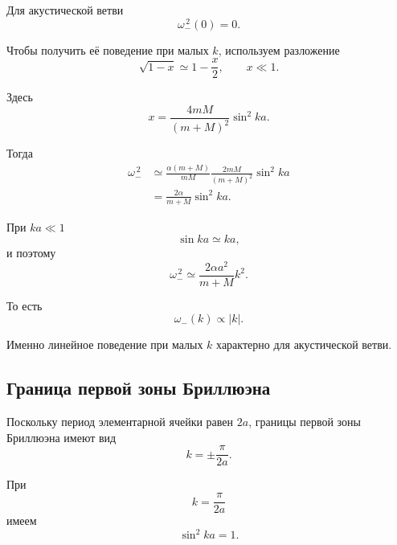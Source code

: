 \documentclass[../final.tex]{subfiles}
\begin{document}
Для акустической ветви
%
\begin{equation*}
    \omega_-^{\,2}(0)=0.
\end{equation*}
%

Чтобы получить её поведение при малых $k$,
используем разложение
%
\begin{equation*}
    \sqrt{1-x}
    \simeq
    1-\frac{x}{2},
    \qquad
    x\ll1.
\end{equation*}
%

Здесь
%
\begin{equation*}
    x
    =
    \frac{4mM}{(m+M)^2}
    \sin^2ka.
\end{equation*}
%

Тогда
%
\begin{align*}
    \omega_-^{\,2}
    &\simeq
    \frac{\alpha(m+M)}{mM}
    \frac{2mM}{(m+M)^2}
    \sin^2ka
    \\
    &=
    \frac{2\alpha}{m+M}
    \sin^2ka.
\end{align*}
%

При $ka\ll1$
%
\begin{equation*}
    \sin ka\simeq ka,
\end{equation*}
%
и поэтому
%
\begin{equation*}
    \omega_-^{\,2}
    \simeq
    \frac{2\alpha a^2}{m+M}
    k^2.
\end{equation*}
%

То есть
%
\begin{equation*}
    \omega_-(k)\propto |k|.
\end{equation*}
%

Именно линейное поведение при малых $k$
характерно для акустической ветви.



\subsection*{Граница первой зоны Бриллюэна}

Поскольку период элементарной ячейки равен $2a$,
границы первой зоны Бриллюэна имеют вид
%
\begin{equation*}
    k
    =
    \pm\frac{\pi}{2a}.
\end{equation*}
%

При
%
\begin{equation*}
    k=\frac{\pi}{2a}
\end{equation*}
%
имеем
%
\begin{equation*}
    \sin^2ka=1.
\end{equation*}
%
\end{document}
